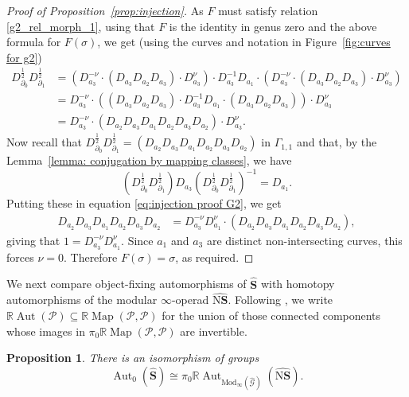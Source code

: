 \documentclass{amsart}
\newcommand{\bS}{\mathbf{S}}
\newcommand{\Grpd}{\mathscr{G}}
\newcommand{\calP}{\mathcal{P}}
\newcommand{\Mod}{\mathrm{Mod}}
\newcommand{\nerve}{\mathrm{N}}
\newcommand{\Aut}{\operatorname{Aut}}
\newcommand{\Map}{\operatorname{Map}}
\newtheorem{prop}[theorem]{Proposition}%
\theoremstyle{definition}
\numberwithin{equation}{section}
\begin{document}
\begin{proof}[Proof of Proposition~\ref{prop:injection}]
    As $F$ must satisfy relation \eqref{g2_rel_morph_1}, using that $F$ is the identity in genus zero and the above formula for $F(\sigma)$, we get (using the curves and notation in Figure~\ref{fig:curves for g2})
        \begin{align}
            D_{\partial_0}^{\frac{1}{2}}D_{\partial_1}^{\frac{1}{2}} &= (D_{a_3}^{-\nu}\cdot(D_{a_3}D_{a_2}D_{a_3}) \cdot D_{a_3}^\nu)\cdot D_{a_3}^{-1} D_{a_1} \cdot (D_{a_3}^{-\nu}\cdot(D_{a_3}D_{a_2}D_{a_3}) \cdot D_{a_3}^\nu)\\
            &=  D_{a_3}^{-\nu}\cdot((D_{a_3}D_{a_2}D_{a_3}) \cdot D_{a_3}^{-1} D_{a_1} \cdot (D_{a_3}D_{a_2}D_{a_3})) \cdot D_{a_3}^\nu\\
            &=D_{a_3}^{-\nu}\cdot(D_{a_2}D_{a_3}D_{a_1}D_{a_2}D_{a_3}D_{a_2}) \cdot D_{a_3}^\nu.\label{eq:injection proof G2}
        \end{align}
    Now recall that $D_{\partial_0}^{\frac{1}{2}}D_{\partial_1}^{\frac{1}{2}}=(D_{a_2}D_{a_3}D_{a_1}D_{a_2}D_{a_3}D_{a_2})$ in $\Gamma_{1,1}$ and that, by the Lemma~\ref{lemma: conjugation by mapping classes}, we have
        \[(D_{\partial_0}^{\frac{1}{2}}D_{\partial_1}^{\frac{1}{2}})D_{a_3}(D_{\partial_0}^{\frac{1}{2}}D_{\partial_1}^{\frac{1}{2}})^{-1}=D_{a_1}.\]
    Putting these in equation \eqref{eq:injection proof G2}, we get
        \begin{align*}
        D_{a_2}D_{a_3}D_{a_1}D_{a_2}D_{a_3}D_{a_2} &=D_{a_3}^{-\nu}D_{a_1}^\nu\cdot(D_{a_2}D_{a_3}D_{a_1}D_{a_2}D_{a_3}D_{a_2}),
        \end{align*}    
    giving that
        $1= D_{a_3}^{-\nu}D_{a_1}^\nu.$
    Since $a_1$ and $a_3$ are distinct non-intersecting curves, this forces $\nu=0$. Therefore $F(\sigma)=\sigma$, as required.
\end{proof}

We next compare object-fixing automorphisms of $\widehat{\bS}$ with homotopy automorphisms of the modular $\infty$-operad $\widehat{\nerve\bS}$. Following \cite[1.2]{dk}, we write $\mathbb R\Aut(\calP)\subseteq \mathbb R\Map(\calP,\calP)$ for the union of those connected components whose images in $\pi_0\mathbb R\Map(\calP,\calP)$ are invertible. 

\begin{prop}\label{prop: strict-to-homotopy-endomorphisms}
There is an isomorphism of groups
\[
\Aut_0(\widehat{\bS})
\cong
\pi_0\mathbb R\Aut_{\Mod_{\infty}(\widehat{\Grpd})}(\widehat{\nerve\bS}).
\]
\end{prop}
\end{document}
